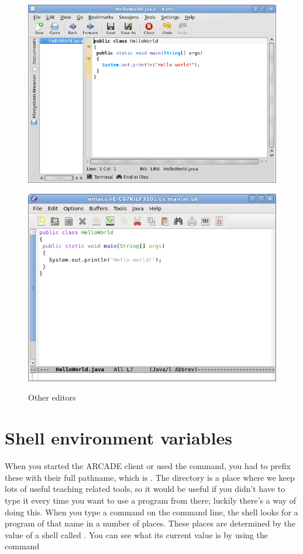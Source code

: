 \begin{figure}
  \begin{minipage}[b]{.5\linewidth}
    \centering
    \includegraphics[width=.8\textwidth]{images/kate}
    \label{subfig:kate}
  \end{minipage}%
  \begin{minipage}[b]{.5\linewidth}
    \centering
    \includegraphics[width=.8\textwidth]{images/emacs}
    \label{subfig:emacs}
  \end{minipage}%
  \caption{Other editors}  \label{fig:texteditors}

\end{figure}

\section{Shell environment variables}

When you started the ARCADE client or used the  command, you had to prefix these with their full pathname, which is . The directory
 is a place where we keep lots of useful
teaching related tools, so it would be useful if you didn't have to
type it every time you want to use a program from there; luckily
there's a way of doing this. When you type a command on the command
line, the shell looks for a program of that name in a number of
places. These places are determined by the value of a shell
 called
. You can see what its current value is by using the
command

